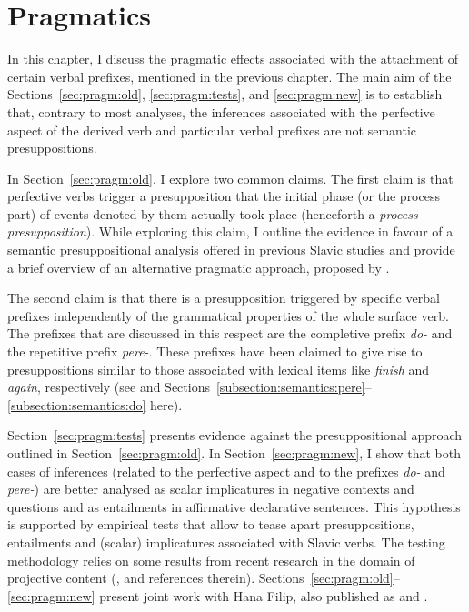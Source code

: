 \chapter{Pragmatics} %
\label{Chapter6}
In this chapter, I discuss the pragmatic effects associated with the attachment of certain verbal prefixes, mentioned in the previous chapter. The main aim of the Sections~\ref{sec:pragm:old}, \ref{sec:pragm:tests}, and \ref{sec:pragm:new} is to establish that, contrary to most analyses, the inferences associated with the perfective aspect of the derived verb and particular verbal prefixes are not semantic presuppositions. 

In Section~\ref{sec:pragm:old}, I explore two common claims. The first claim is that perfective verbs trigger a presupposition that the initial phase (or the process part) of events denoted by them actually took place (henceforth a \textit{process presupposition}). While exploring this claim, I outline the evidence in favour of a semantic presuppositional analysis offered in previous Slavic studies and provide a brief overview of an alternative pragmatic approach, proposed by \citet{Gronn:04, Gronn:06}.

The second claim is that there is a presupposition triggered by specific verbal prefixes independently of the grammatical properties of the whole surface verb. The prefixes that are discussed in this respect are the completive prefix \textit{do-} and the repetitive prefix \textit{pere-}. These prefixes have been claimed to give rise to presuppositions similar to those associated with lexical items like \textit{finish} and \textit{again}, respectively (see \citealt{Kagan:book} and Sections~\ref{subsection:semantics:pere}--\ref{subsection:semantics:do} here).

Section~\ref{sec:pragm:tests} presents evidence against the presuppositional approach outlined in Section~\ref{sec:pragm:old}. In Section~\ref{sec:pragm:new}, I show that both cases of inferences (related to the perfective aspect and to the prefixes \textit{do-} and \textit{pere-}) are better analysed as scalar implicatures in negative contexts and questions and as entailments in affirmative declarative sentences. This hypothesis is supported by empirical tests that allow to tease apart presuppositions, entailments and (scalar) implicatures associated with Slavic verbs. The testing methodology relies on some results from recent research in the domain of projective content (\citealp{Schlenker:08, Chemla:09, Romoli:11}, and references therein). Sections~\ref{sec:pragm:old}--\ref{sec:pragm:new} present joint work with Hana Filip, also published as \citealt{ZinovaFilip:SALT} and \citealt{ZinovaFilip:14}. %

